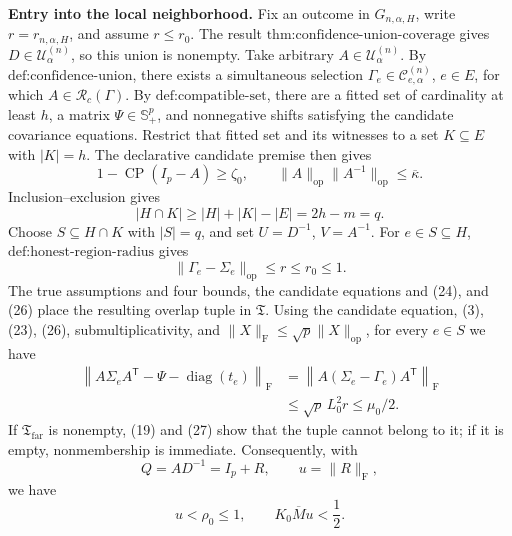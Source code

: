 \textbf{Entry into the local neighborhood.}
Fix an outcome in \(G_{n,\alpha,H}\), write \(r=r_{n,\alpha,H}\), and assume \(r\leq r_0\). The result \(\text{thm:confidence-union-coverage}\) gives \(D\in\mathcal U^{(n)}_\alpha\), so this union is nonempty. Take arbitrary \(A\in\mathcal U^{(n)}_\alpha\). By \(\text{def:confidence-union}\), there exists a simultaneous selection \(\Gamma_e\in\mathcal C^{(n)}_{e,\alpha}\), \(e\in E\), for which \(A\in\mathcal R_c(\Gamma)\). By \(\text{def:compatible-set}\), there are a fitted set of cardinality at least \(h\), a matrix \(\Psi\in\mathbb S_+^p\), and nonnegative shifts satisfying the candidate covariance equations. Restrict that fitted set and its witnesses to a set \(K\subseteq E\) with \(|K|=h\). The declarative candidate premise then gives
\[
1-\operatorname{CP}(I_p-A)\geq\zeta_0,
\qquad
\|A\|_{\mathrm{op}}\|A^{-1}\|_{\mathrm{op}}
\leq\overline\kappa.
\tag{24}
\]
Inclusion--exclusion gives
\[
|H\cap K|
\geq|H|+|K|-|E|
=2h-m=q.
\tag{25}
\]
Choose \(S\subseteq H\cap K\) with \(|S|=q\), and set \(U=D^{-1}\), \(V=A^{-1}\). For \(e\in S\subseteq H\), \(\text{def:honest-region-radius}\) gives
\[
\|\Gamma_e-\Sigma_e\|_{\mathrm{op}}\leq r\leq r_0\leq1.
\tag{26}
\]
The true assumptions and four bounds, the candidate equations and (24), and (26) place the resulting overlap tuple in \(\mathfrak T\). Using the candidate equation, (3), (23), (26), submultiplicativity, and \(\|X\|_{\mathrm F}\leq\sqrt p\|X\|_{\mathrm{op}}\), for every \(e\in S\) we have
\[
\begin{aligned}
\left\|A\Sigma_eA^{\mathsf T}
-\Psi-\operatorname{diag}(t_e)\right\|_{\mathrm F}
&=\left\|A(\Sigma_e-\Gamma_e)A^{\mathsf T}\right\|_{\mathrm F}\\
&\leq\sqrt p\,L_0^2r
\leq\mu_0/2.
\end{aligned}
\tag{27}
\]
If \(\mathfrak T_{\mathrm{far}}\) is nonempty, (19) and (27) show that the tuple cannot belong to it; if it is empty, nonmembership is immediate. Consequently, with
\[
Q=AD^{-1}=I_p+R,
\qquad
u=\|R\|_{\mathrm F},
\]
we have
\[
u<\rho_0\leq1,
\qquad
K_0\overline M u<\frac12.
\tag{28}
\]

